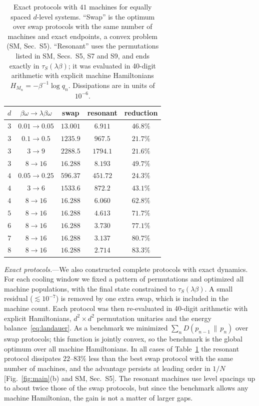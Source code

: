 \documentclass[aps,prl,reprint,superscriptaddress,amsmath,amssymb]{revtex4-2}
\newcommand{\Dr}[2]{D(#1\,\|\,#2)}
\begin{document}
\begin{table}[t]
\caption{Exact protocols with $41$ machines for equally spaced $d$-level systems. ``Swap'' is the optimum over swap
protocols with the same number of machines and exact endpoints, a convex problem (SM, Sec.~S5). ``Resonant'' uses the
permutations listed in SM, Secs.~S5, S7 and S9, and ends exactly in $\tau_S(\lambda\beta)$; it was evaluated in
40-digit arithmetic with explicit machine Hamiltonians $H_{M_n}=-\beta^{-1}\log q_n$. Dissipations are in units of
$10^{-6}$.}
\label{tab:exact}
\begin{ruledtabular}
\begin{tabular}{ccccc}
$d$ & $\beta\omega\to\lambda\beta\omega$ & swap & resonant & reduction \\ \hline
$3$ & $0.01\to0.05$ & $13.001$ & $6.911$ & $46.8\%$ \\
$3$ & $0.1\to0.5$ & $1235.9$ & $967.5$ & $21.7\%$ \\
$3$ & $3\to9$ & $2288.5$ & $1794.1$ & $21.6\%$ \\
$3$ & $8\to16$ & $16.288$ & $8.193$ & $49.7\%$ \\
$4$ & $0.05\to0.25$ & $596.37$ & $451.72$ & $24.3\%$ \\
$4$ & $3\to6$ & $1533.6$ & $872.2$ & $43.1\%$ \\
$4$ & $8\to16$ & $16.288$ & $6.060$ & $62.8\%$ \\
$5$ & $8\to16$ & $16.288$ & $4.613$ & $71.7\%$ \\
$6$ & $8\to16$ & $16.288$ & $3.730$ & $77.1\%$ \\
$7$ & $8\to16$ & $16.288$ & $3.137$ & $80.7\%$ \\
$8$ & $8\to16$ & $16.288$ & $2.714$ & $83.3\%$ \\
\end{tabular}
\end{ruledtabular}
\end{table}

\emph{Exact protocols.}---We also constructed complete protocols with exact dynamics. For each cooling window we fixed
a pattern of permutations and optimized all machine populations, with the final state constrained to
$\tau_S(\lambda\beta)$. A small residual ($\lesssim10^{-7}$) is removed by one extra swap, which is included in the
machine count. Each protocol was then re-evaluated in 40-digit arithmetic with explicit Hamiltonians, $d^2\times d^2$
permutation unitaries and the energy balance~\eqref{eq:landauer}. As a benchmark we minimized $\sum_n\Dr{p_{n-1}}{p_n}$
over swap protocols; this function is jointly convex, so the benchmark is the global optimum over all machine
Hamiltonians. In all cases of Table~\ref{tab:exact} the resonant protocol dissipates $22$--$83\%$ less than the best
swap protocol with the same number of machines, and the advantage persists at leading order in $1/N$
[Fig.~\ref{fig:main}(b) and SM, Sec.~S5]. The resonant machines use level spacings up to about twice those of the swap
protocols, but since the benchmark allows any machine Hamiltonian, the gain is not a matter of larger gaps.
\end{document}
